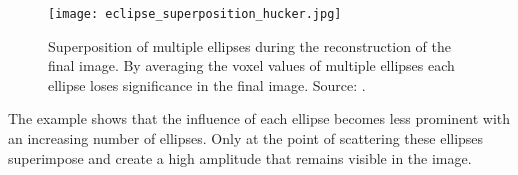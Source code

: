 


\begin{figure}[H]
    \centering
    \texttt{[image: eclipse\_superposition\_hucker.jpg]}
    \caption{ Superposition of multiple ellipses during the reconstruction of the final image. By averaging the voxel values of multiple ellipses each ellipse loses significance in the final image.
    Source: \cite{PatrickHucker2014EvaluationRuckstreumodells}.}
    \label{eclipse_super}
\end{figure}

The example shows that the influence of each ellipse becomes less prominent with an increasing number of ellipses. Only at the point of scattering these ellipses superimpose and create a high amplitude that remains visible in the image.




